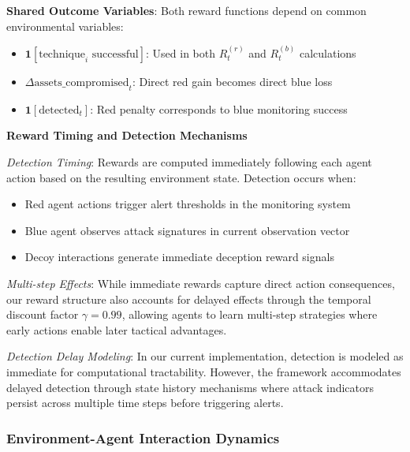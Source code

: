 \documentclass[12pt,oneside]{article}
\begin{document}
\textbf{Shared Outcome Variables}: Both reward functions depend on common environmental variables:
\begin{itemize}
    \item $\mathbf{1}[\text{technique}_i \text{ successful}]$: Used in both $R^{(r)}_t$ and $R^{(b)}_t$ calculations
    \item $\Delta\text{assets\_compromised}_t$: Direct red gain becomes direct blue loss
    \item $\mathbf{1}[\text{detected}_t]$: Red penalty corresponds to blue monitoring success
\end{itemize}

\textbf{Reward Timing and Detection Mechanisms}

\textit{Detection Timing}: Rewards are computed immediately following each agent action based on the resulting environment state. Detection occurs when:
\begin{itemize}
    \item Red agent actions trigger alert thresholds in the monitoring system
    \item Blue agent observes attack signatures in current observation vector
    \item Decoy interactions generate immediate deception reward signals
\end{itemize}

\textit{Multi-step Effects}: While immediate rewards capture direct action consequences, our reward structure also accounts for delayed effects through the temporal discount factor $\gamma = 0.99$, allowing agents to learn multi-step strategies where early actions enable later tactical advantages.

\textit{Detection Delay Modeling}: In our current implementation, detection is modeled as immediate for computational tractability. However, the framework accommodates delayed detection through state history mechanisms where attack indicators persist across multiple time steps before triggering alerts.

\subsubsection{Environment-Agent Interaction Dynamics}
\end{document}
